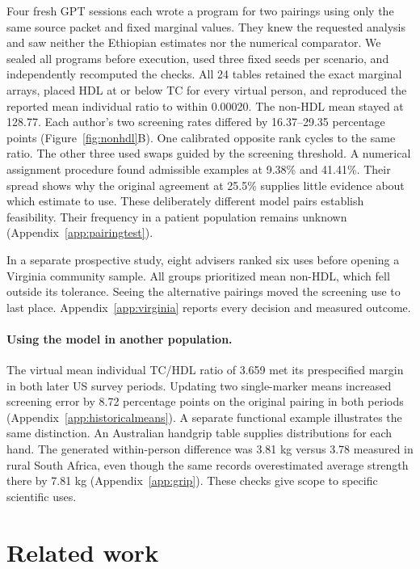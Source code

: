 \documentclass[sigconf,anonymous,review]{acmart}
\begin{document}
Four fresh GPT sessions each wrote a program for two pairings using only the same source packet and fixed marginal values. They knew the requested analysis and saw neither the Ethiopian estimates nor the numerical comparator. We sealed all programs before execution, used three fixed seeds per scenario, and independently recomputed the checks. All 24 tables retained the exact marginal arrays, placed HDL at or below TC for every virtual person, and reproduced the reported mean individual ratio to within 0.00020. The non-HDL mean stayed at 128.77. Each author's two screening rates differed by 16.37--29.35 percentage points (Figure~\ref{fig:nonhdl}B). One calibrated opposite rank cycles to the same ratio. The other three used swaps guided by the screening threshold. A numerical assignment procedure found admissible examples at 9.38\% and 41.41\%. Their spread shows why the original agreement at 25.5\% supplies little evidence about which estimate to use. These deliberately different model pairs establish feasibility. Their frequency in a patient population remains unknown (Appendix~\ref{app:pairingtest}).

In a separate prospective study, eight advisers ranked six uses before opening a Virginia community sample. All groups prioritized mean non-HDL, which fell outside its tolerance. Seeing the alternative pairings moved the screening use to last place. Appendix~\ref{app:virginia} reports every decision and measured outcome.

\paragraph{Using the model in another population.}
The virtual mean individual TC/HDL ratio of 3.659 met its prespecified margin in both later US survey periods. Updating two single-marker means increased screening error by 8.72 percentage points on the original pairing in both periods (Appendix~\ref{app:historicalmeans}). A separate functional example illustrates the same distinction. An Australian handgrip table supplies distributions for each hand. The generated within-person difference was 3.81 kg versus 3.78 measured in rural South Africa, even though the same records overestimated average strength there by 7.81 kg (Appendix~\ref{app:grip}). These checks give scope to specific scientific uses.

\section{Related work}
\end{document}
